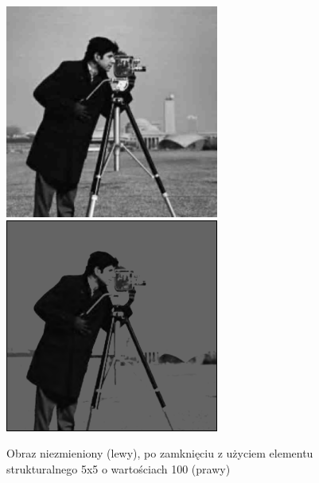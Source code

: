 \documentclass[a4paper,12pt]{book}
\begin{document}
\begin{figure}[H]
	\caption{Obraz niezmieniony (lewy), po zamknięciu z użyciem elementu strukturalnego 5x5 o wartościach 100 (prawy)}
	\includegraphics[width=7cm, height=7cm]{man-unmodified.jpg}
	\includegraphics[width=7cm, height=7cm]{morph-gray-closing-strel5x5-100.png}
\end{figure}
\end{document}
